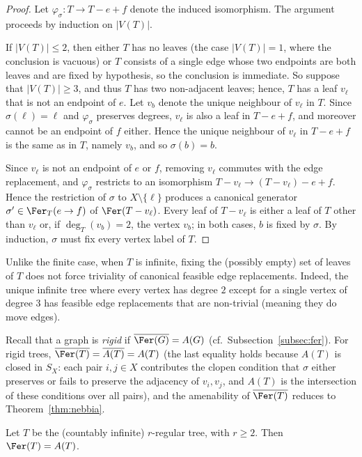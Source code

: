\begin{proof}
    Let $\varphi_\sigma\colon T\to T-e+f$ denote the induced isomorphism.
    The argument proceeds by induction on $|V(T)|$.

    If $|V(T)|\leq 2$, then either $T$ has no leaves (the case $|V(T)|=1$, where the conclusion is vacuous) or $T$ consists of a single edge whose two endpoints are both leaves and are fixed by hypothesis, so the conclusion is immediate.
    So suppose that $|V(T)|\geq 3$, and thus $T$ has two non-adjacent leaves; hence, $T$ has a leaf $v_\ell$ that is not an endpoint of $e$.
    Let $v_b$ denote the unique neighbour of $v_\ell$ in $T$.
    Since $\sigma(\ell)=\ell$ and $\varphi_\sigma$ preserves degrees, $v_\ell$ is also a leaf in $T-e+f$, and moreover cannot be an endpoint of $f$ either.
    Hence the unique neighbour of $v_\ell$ in $T-e+f$ is the same as in $T$, namely $v_b$, and so $\sigma(b)=b$.

    Since $v_\ell$ is not an endpoint of $e$ or $f$, removing $v_\ell$ commutes with the edge replacement, and $\varphi_\sigma$ restricts to an isomorphism $T-v_\ell\to(T-v_\ell)-e+f$.
    Hence the restriction of $\sigma$ to $X\setminus\{\ell\}$ produces a canonical generator $\sigma'\in\Fer_T(e\to f)$ of $\Fer(T-v_\ell)$.
    Every leaf of $T-v_\ell$ is either a leaf of $T$ other than $v_\ell$ or, if $\deg_T(v_b)=2$, the vertex $v_b$; in both cases, $b$ is fixed by $\sigma$.
    By induction, $\sigma$ must fix every vertex label of $T$.
\end{proof}

Unlike the finite case, when $T$ is infinite, fixing the (possibly empty) set of leaves of $T$ does not force triviality of canonical feasible edge replacements.
Indeed, the unique infinite tree where every vertex has degree $2$ except for a single vertex of degree $3$ has feasible edge replacements that are non-trivial (meaning they do move edges).

Recall that a graph is \emph{rigid} if $\overline{\Fer(G)}=A(G)$ (cf.\ Subsection~\ref{subsec:fer}).
For rigid trees, $\overline{\Fer(T)}=\overline{A(T)}=A(T)$ (the last equality holds because $A(T)$ is closed in $S_X$: each pair $i,j\in X$ contributes the clopen condition that $\sigma$ either preserves or fails to preserve the adjacency of $v_i,v_j$, and $A(T)$ is the intersection of these conditions over all pairs), and the amenability of $\overline{\Fer(T)}$ reduces to Theorem~\ref{thm:nebbia}.

\begin{proposition}\label{prop:r-regular-rigid}
    Let $T$ be the (countably infinite) $r$-regular tree, with $r\geq 2$.
    Then $\Fer(T)=A(T)$.
\end{proposition}

